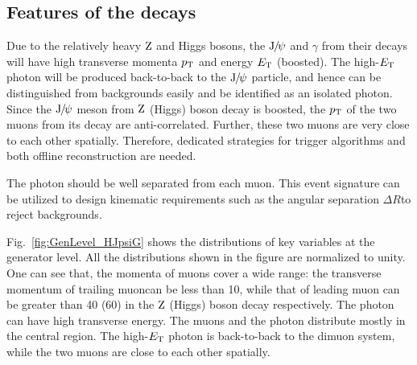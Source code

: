 \subsection{Features of the decays}
Due to the relatively heavy $\mathrm{Z}$ and Higgs bosons, the ${\mathrm{J}\hspace{-.08em}/\hspace{-.14em}\psi}$ and $\gamma$ from their decays will have high transverse momenta $p_{\mathrm{T}}$ and energy $E_{\mathrm{T}}$ (boosted). The high-$E_{\mathrm{T}}$ photon will be produced back-to-back to the ${\mathrm{J}\hspace{-.08em}/\hspace{-.14em}\psi}$ particle, and hence can be distinguished from backgrounds easily and be identified as an isolated photon. 
Since the ${\mathrm{J}\hspace{-.08em}/\hspace{-.14em}\psi}$ meson from $\mathrm{Z}$ (Higgs) boson decay is boosted, the $p_{\mathrm{T}}$ of the two muons from its decay are anti-correlated. Further, these two muons are very close to each other spatially. Therefore, dedicated strategies for trigger algorithms and both offline reconstruction are needed. 

The photon should be well separated from each muon. This event signature can be utilized to design kinematic requirements such as the angular separation $\Delta R$\footnotemark to reject backgrounds. 

Fig.~\ref{fig:GenLevel_HJpsiG} shows the distributions of key variables at the generator level. All the distributions shown in the figure are normalized to unity. One can see that, the momenta of muons cover a wide range: the transverse momentum \pt of trailing muon\footnotemark can be less than 10\GeV, while that of leading muon can be greater than 40 (60) \GeV in the $\mathrm{Z}$ (Higgs) boson decay respectively. The photon can have high transverse energy. The muons and the photon distribute mostly in the central region. The high-$E_{\mathrm{T}}$ photon is back-to-back to the dimuon system, while the two muons are close to each other spatially. 

